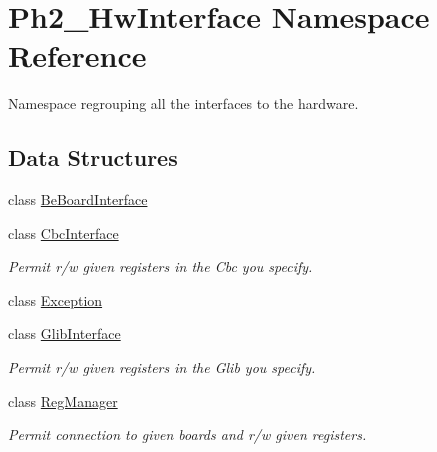 \hypertarget{namespace_ph2___hw_interface}{\section{Ph2\-\_\-\-Hw\-Interface Namespace Reference}
\label{namespace_ph2___hw_interface}
}


Namespace regrouping all the interfaces to the hardware.  


\subsection*{Data Structures}
\begin{DoxyCompactItemize}
\item 
class \hyperlink{class_ph2___hw_interface_1_1_be_board_interface}{Be\-Board\-Interface}
\item 
class \hyperlink{class_ph2___hw_interface_1_1_cbc_interface}{Cbc\-Interface}
\begin{DoxyCompactList}\small\item\em Permit r/w given registers in the Cbc you specify. \end{DoxyCompactList}\item 
class \hyperlink{class_ph2___hw_interface_1_1_exception}{Exception}
\item 
class \hyperlink{class_ph2___hw_interface_1_1_glib_interface}{Glib\-Interface}
\begin{DoxyCompactList}\small\item\em Permit r/w given registers in the Glib you specify. \end{DoxyCompactList}\item 
class \hyperlink{class_ph2___hw_interface_1_1_reg_manager}{Reg\-Manager}
\begin{DoxyCompactList}\small\item\em Permit connection to given boards and r/w given registers. \end{DoxyCompactList}\end{DoxyCompactItemize}
